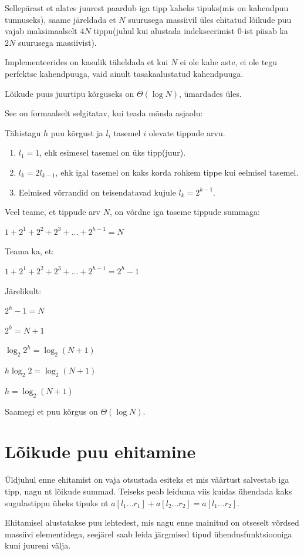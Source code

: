 \documentclass{trkut}
\theoremstyle{definition}
\begin{document}
Sellepärast et alates juurest paardub iga tipp kaheks tipuks(mis on kahendpuu tunnuseks), saame järeldada et $N$ suurusega massiivil üles ehitatud lõikude puu vajab maksimaalselt $4N$ tippu(juhul kui alustada indekseerimist 0-ist piisab ka $2N$ suurusega massiivist). \parencite{EMaxx}

Implementeerides on kasulik täheldada et kui $N$ ei ole kahe aste, ei ole tegu perfektse kahendpuuga, vaid ainult tasakaalustatud kahendpuuga. 

Lõikude puus juurtipu kõrguseks on $\Theta(\log N)$, ümardades üles. \parencite{EMaxx}

See on formaalselt selgitatav, kui teada mõnda asjaolu:

Tähistagu $h$ puu kõrgust ja $l_i$ tasemel $i$ olevate tippude arvu.
\begin{enumerate}
    \item $l_1 = 1$, ehk esimesel tasemel on üks tipp(juur).
    \item $l_k = 2l_{k−1}$, ehk igal tasemel on kaks korda rohkem tippe kui eelmisel tasemel.
    \item Eelmised võrrandid on teisendatavad kujule $l_k = 2^{k−1}$.
\end{enumerate}

Veel teame, et tippude arv $N$, on võrdne iga taseme tippude summaga:

$1 + 2^1 + 2^2 + 2^3 + ... + 2^{h−1} = N$

Teama ka, et:

$1 + 2^1 + 2^2 + 2^3 + ... + 2^{h−1} = 2^h − 1$

Järelikult:
    
$2^h − 1 = N$

$2^h = N + 1$
 
$\log_2 2^h = \log_2 (N + 1)$

$h \log_2 2 = \log_2 (N + 1)$

$h = \log_2(N + 1)$

Saamegi et puu kõrgus on $\Theta(\log N)$. \parencite{height}

\section{Lõikude puu ehitamine}
Üldjuhul enne ehitamist on vaja otsustada esiteks et mis väärtust salvestab iga tipp, nagu nt lõikude summad. Teiseks peab leiduma viis kuidas ühendada kaks sugulastippu üheks tipuks nt $a[l_1...r_1]+a[l_2...r_2]=a[l_1...r_2]$. \parencite{EMaxx}

Ehitamisel alustatakse puu lehtedest, mis nagu enne mainitud on otseselt võrdsed massiivi elementidega, seejärel saab leida järgmised tipud ühendusfunktsiooniga kuni juureni välja. \parencite{EMaxx}
\end{document}
